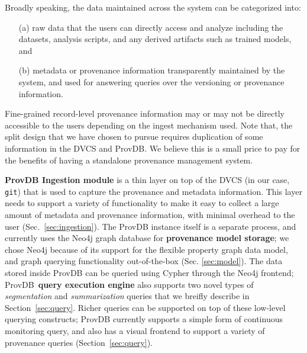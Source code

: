 \documentclass[11pt]{article}
\newcommand{\provdb}{{\sc ProvDB}\xspace}
\newcommand{\git}{{\tt git}\xspace}
\begin{document}
Broadly speaking, the data maintained across the system can be categorized into: 
\begin{itemize}
\item[(a)] raw data that the users can directly access and analyze including the datasets, analysis scripts, and any derived artifacts such as trained models, and 
\item[(b)] metadata or provenance information transparently maintained by the system, and used for answering queries over the versioning or provenance information. 
\end{itemize}
Fine-grained record-level provenance information may or may not be directly accessible to the users depending on the ingest mechanism used. Note that, the split design that we have chosen to pursue requires duplication of some information in the DVCS and \provdb. We believe this is a small price to pay for the benefits of having a standalone provenance management system.

{\bf \provdb Ingestion module} is a thin layer on top of the DVCS (in our case, \git) that is used to capture the provenance and metadata information. This layer needs
to support a variety of functionality to make it easy to collect a large amount of metadata and provenance information, with minimal overhead to the user
(Sec.~\ref{sec:ingestion}). The \provdb instance itself is a separate process, and currently uses the Neo4j graph database for {\bf provenance model storage}; we chose Neo4j because of its support for the flexible property graph data model, and graph querying functionality out-of-the-box (Sec. \ref{sec:model}). 
The data stored inside \provdb can be queried using Cypher through the Neo4j frontend; \provdb\ {\bf query execution engine} also supports two novel types of {\em
segmentation} and {\em summarization} queries that we breifly describe in Section~\ref{sec:query}. Richer queries can be supported on top of these low-level querying
constructs; \provdb currently supports a simple form of continuous monitoring query, and also has a visual frontend to support a variety of provenance queries (Section~\ref{sec:query}).
\end{document}
